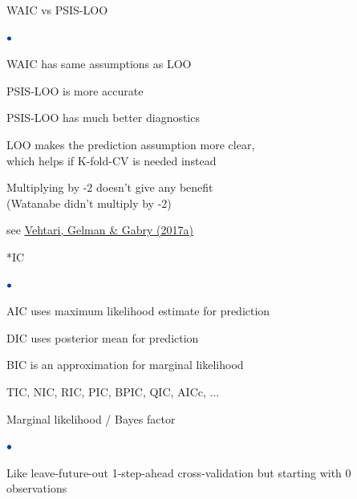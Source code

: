 \documentclass[english,t]{beamer}
\newenvironment{list1}{
   \begin{list}{$\color{list1}\bullet$}{\itemsep=6pt}}{
  \end{list}}
\begin{document}
\begin{frame}{WAIC vs PSIS-LOO}

\begin{list1}
  \item<2-> WAIC has same assumptions as LOO
  \item<3-> PSIS-LOO is more accurate 
  \item<4-> PSIS-LOO has much better diagnostics
  \item<5-> LOO makes the prediction assumption more clear,\\ which
    helps if K-fold-CV is needed instead
  \item<6-> Multiplying by -2 doesn't give any benefit\\ (Watanabe
    didn't multiply by -2)
\end{list1}

\vspace{6\baselineskip}
{\small see \href{http://link.springer.com/article/10.1007/s11222-016-9696-4}{Vehtari, Gelman \& Gabry (2017a)}}
\end{frame}

\begin{frame}{*IC}

\begin{list1}
  \item AIC uses maximum likelihood estimate for prediction
  \item DIC uses posterior mean for prediction
  \item BIC is an approximation for marginal likelihood
  \item TIC, NIC, RIC, PIC, BPIC, QIC, AICc, ...
\end{list1}

\end{frame}

\begin{frame}{Marginal likelihood / Bayes factor}

\vspace{-0.3\baselineskip}
\begin{list1}
\item Like leave-future-out 1-step-ahead cross-validation but starting with 0 observations\\
\end{list1}
\vspace{-0.5\baselineskip}

\end{frame}
\end{document}
